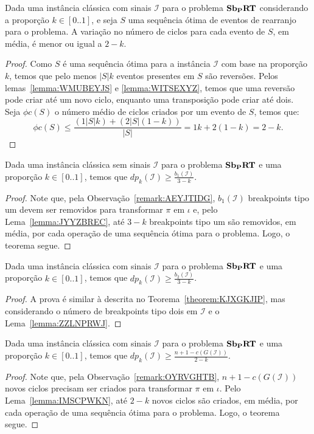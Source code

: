 \begin{lemma}\label{lemma:IMSCPWKN}
Dada uma instância clássica com sinais $\mathcal{I}$ para o problema $\textbf{Sb\textsubscript{P}RT}{}$ considerando a proporção $k \in [0..1]$, e seja $S$ uma sequência ótima de eventos de rearranjo para o problema. A variação no número de ciclos para cada evento de $S$, em média, é menor ou igual a $2-k$.
\end{lemma}
\begin{proof}
Como $S$ é uma sequência ótima para a instância $\mathcal{I}$ com base na proporção $k$, temos que pelo menos $|S|k$ eventos presentes em $S$ são reversões. Pelos lemas~\ref{lemma:WMUBEYJS} e \ref{lemma:WITSEXYZ}, temos que uma reversão pode criar até um novo ciclo, enquanto uma transposição pode criar até dois. Seja $\phi c(S)$ o número médio de ciclos criados por um evento de $S$, temos que:
$$\phi c(S) \leq \frac{(1 |S| k) + (2 |S| (1 - k))}{|S|} = 1k + 2(1 - k) = 2 - k.$$
\end{proof}

\begin{theorem}\label{theorem:KJXGKJIP}
Dada uma instância clássica sem sinais $\mathcal{I}$ para o problema $\textbf{Sb\textsubscript{P}RT}{}$ e uma proporção $k \in [0..1]$, temos que $dp_{k}(\mathcal{I}) \ge \frac{b_1(\mathcal{I})}{3-k}$.
\end{theorem}
\begin{proof}
Note que, pela Observação~\ref{remark:AEYJTIDG}, $b_1(\mathcal{I})$ breakpoints tipo um devem ser removidos para transformar $\pi$ em $\iota$ e, pelo Lema~\ref{lemma:JYYZBREC}, até $3-k$ breakpoints tipo um são removidos, em média, por cada operação de uma sequência ótima para o problema. Logo, o teorema segue.
\end{proof}

\begin{theorem}\label{theorem:ABGZQHIL}
Dada uma instância clássica com sinais $\mathcal{I}$ para o problema $\textbf{Sb\textsubscript{P}RT}{}$ e uma proporção $k \in [0..1]$, temos que $dp_{k}(\mathcal{I}) \ge \frac{b_2(\mathcal{I})}{3-k}$.
\end{theorem}
\begin{proof}
A prova é similar à descrita no Teorema~\ref{theorem:KJXGKJIP}, mas considerando o número de breakpoints tipo dois em $\mathcal{I}$ e o Lema~\ref{lemma:ZZLNPRWJ}.
\end{proof}

\begin{theorem}\label{theorem:WSTPPSMD}
Dada uma instância clássica com sinais $\mathcal{I}$ para o problema $\textbf{Sb\textsubscript{P}RT}{}$ e uma proporção $k \in [0..1]$, temos que $dp_{k}(\mathcal{I}) \ge \frac{n + 1 - c(G(\mathcal{I}))}{2-k}$.
\end{theorem}
\begin{proof}
Note que, pela Observação~\ref{remark:OYRVGHTB}, $n+1 - c(G(\mathcal{I}))$ novos ciclos precisam ser criados para transformar $\pi$ em $\iota$. Pelo Lema~\ref{lemma:IMSCPWKN}, até $2-k$ novos ciclos são criados, em média, por cada operação de uma sequência ótima para o problema. Logo, o teorema segue.
\end{proof}

